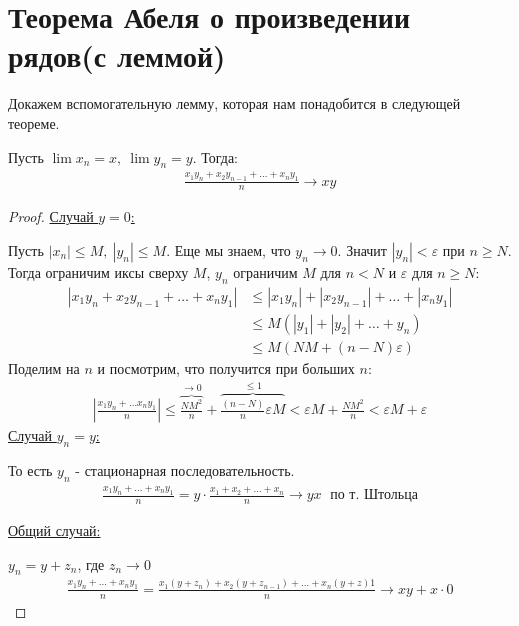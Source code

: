 \section{Теорема Абеля о произведении рядов(с леммой)}
Докажем вспомогательную лемму, которая нам понадобится в следующей теореме.
\begin{lemma}
    Пусть $\lim x_n = x,\ \lim y_n = y$. Тогда:
    \begin{gather*}
        \frac{x_1 y_n + x_2y_{n-1} + \ldots + x_ny_1}{n} \to xy
    \end{gather*}
\end{lemma}
\begin{proof} \quad 

    \underline{Случай $y = 0$:}

    Пусть $|x_n| \leq M,\ |y_n| \leq M$. Еще мы знаем, что $y_n \to 0$. Значит $|y_n| < \varepsilon$ при $n \geq N$.
    Тогда ограничим иксы сверху $M$, $y_n$ ограничим $M$ для $n < N$ и $\varepsilon$ для $n \geqslant N$:
    \begin{align*}
        |x_1y_n + x_2y_{n-1} + \ldots + x_ny_1| &\leqslant |x_1y_n| + |x_2y_{n-1}| + \ldots + |x_ny_1| \\
        &\leqslant M(|y_1|+|y_2|+\ldots + y_n) \\
        &\leqslant M(NM + (n-N)\varepsilon)
    \end{align*}
    Поделим на $n$ и посмотрим, что получится при больших $n$:
    \begin{gather*}
        \left|\frac{x_1y_n+\ldots x_ny_1}{n}\right|
        \leqslant \overbrace{\frac{NM^2}{n}}^{\to 0} +  \overbrace{\frac{(n-N)}{n}\varepsilon M}^{\leq 1} 
        < \varepsilon M + \frac{NM^2}{n}
        < \varepsilon M + \varepsilon
    \end{gather*}
    \underline{Случай $y_n = y$:} 
    
    То есть $y_n$ - стационарная последовательность.
    \begin{gather*}
        \frac{x_1y_n + \ldots + x_ny_1}{n} = y \cdot \frac{x_1+x_2+\ldots+x_n}{n} \longrightarrow yx \; \text{ по т. Штольца}
    \end{gather*}

    \underline{Общий случай:} 
    
    $y_n = y+z_n$, где $z_n \longrightarrow 0$
    \begin{gather*}
        \frac{x_1y_n + \ldots + x_ny_1}{n} = \frac{x_1(y+z_n) + x_2(y+z_{n-1}) + \ldots + x_n(y+z)1}{n} \longrightarrow xy + x\cdot 0 
    \end{gather*}
\end{proof}
